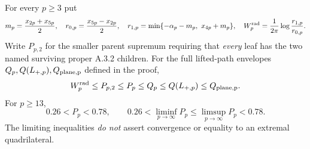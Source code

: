 \begin{theorem}
\label{thm:sandwich}
For every $p\ge3$ put
\[
 m_p=\frac{x_{2p}+x_{5p}}2,\quad
 r_{0,p}=\frac{x_{5p}-x_{2p}}2,\quad
 r_{1,p}=\min\{-\alpha_p-m_p,\ x_{4p}+m_p\},\quad
 W_p^{\rm rad}=\frac1{2\pi}\log\frac{r_{1,p}}{r_{0,p}}.
\]
Write $P_{p,2}$ for the smaller parent
supremum requiring that \emph{every}
leaf has the two named surviving proper
A.3.2 children.  For the full lifted-path
envelopes $Q_p,Q(L_{+,p}),Q_{\rm plane,p}$
defined in the proof,
\begin{equation}\label{eq:sandwich}
 W_p^{\rm rad}\le P_{p,2}\le P_p
 \le Q_p\le Q(L_{+,p})\le Q_{\rm plane,p}.
\end{equation}
For $p\ge13$,
\[
 0.26<P_p<0.78,\qquad
 0.26<\liminf_{p\to\infty}P_p
 \le\limsup_{p\to\infty}P_p<0.78.
\]
The limiting inequalities \emph{do not}
assert convergence or equality to an
extremal quadrilateral.
\end{theorem}
